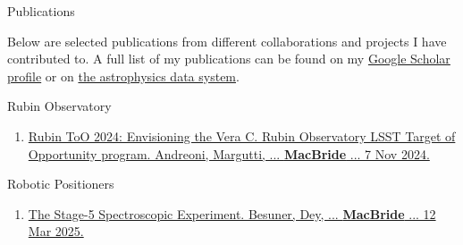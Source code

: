 \documentclass{resume} %
\begin{document}
\begin{rSection}{Publications}


Below are selected publications from different collaborations and projects I have contributed to. A full list of my publications can be found on my \href{https://scholar.google.com/citations?user=XtRTswUAAAAJ&hl=en}{Google Scholar profile} or on \href{https://ui.adsabs.harvard.edu/search/fq=\%7B!type\%3Daqp\%20v\%3D\%24fq_database\%7D&fq_database=(database\%3Aastronomy\%20OR\%20database\%3Aphysics)&p_=0&q=((\%20author\%3A\%22Macbride\%2C\%20Sean\%22)\%20AND\%20year\%3A2019-2150)&sort=date\%20desc\%2C\%20bibcode\%20desc}{the astrophysics data system}.

    \begin{rSubsection}{Rubin Observatory}{}{}{} %
        \begin{enumerate}
            \item \href{https://arxiv.org/abs/2411.04793}{Rubin ToO 2024: Envisioning the Vera C. Rubin Observatory LSST Target of Opportunity program. Andreoni, Margutti, ... \textbf{MacBride} ... 7 Nov 2024.} 
            
        \end{enumerate}
            
    \end{rSubsection}    
    
%            
%            
%
%            
%            
%
%            
%            
%    
    \begin{rSubsection}{Robotic Positioners}{}{}{} %
        \begin{enumerate}
            \item \href{https://arxiv.org/abs/2503.07923}{The Stage-5 Spectroscopic Experiment. Besuner, Dey, ... \textbf{MacBride} ... 12 Mar 2025.}
            

\end{enumerate}
\end{rSubsection}
\end{rSection}
\end{document}

